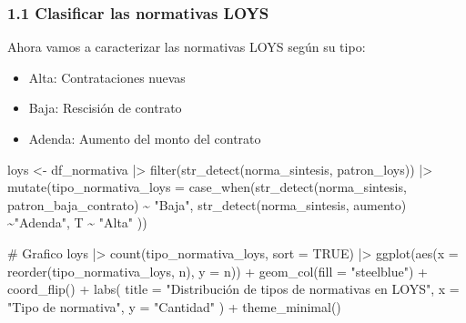 \documentclass[
  letterpaper,
  DIV=11,
  numbers=noendperiod]{scrreprt}
\newenvironment{Shaded}{\begin{snugshade}}{\end{snugshade}}
\newcommand{\AttributeTok}[1]{\textcolor[rgb]{0.40,0.45,0.13}{#1}}
\newcommand{\CommentTok}[1]{\textcolor[rgb]{0.37,0.37,0.37}{#1}}
\newcommand{\ConstantTok}[1]{\textcolor[rgb]{0.56,0.35,0.01}{#1}}
\newcommand{\FunctionTok}[1]{\textcolor[rgb]{0.28,0.35,0.67}{#1}}
\newcommand{\NormalTok}[1]{\textcolor[rgb]{0.00,0.23,0.31}{#1}}
\newcommand{\OtherTok}[1]{\textcolor[rgb]{0.00,0.23,0.31}{#1}}
\newcommand{\SpecialCharTok}[1]{\textcolor[rgb]{0.37,0.37,0.37}{#1}}
\newcommand{\StringTok}[1]{\textcolor[rgb]{0.13,0.47,0.30}{#1}}
\begin{document}
\subsubsection{1.1 Clasificar las normativas
LOYS}\label{clasificar-las-normativas-loys}

Ahora vamos a caracterizar las normativas LOYS según su tipo:

\begin{itemize}
\item
  Alta: Contrataciones nuevas
\item
  Baja: Rescisión de contrato
\item
  Adenda: Aumento del monto del contrato
\end{itemize}

\begin{Shaded}
\begin{Highlighting}[]
\NormalTok{loys }\OtherTok{\textless{}{-}}\NormalTok{ df\_normativa  }\SpecialCharTok{|\textgreater{}} 
  \FunctionTok{filter}\NormalTok{(}\FunctionTok{str\_detect}\NormalTok{(norma\_sintesis, patron\_loys)) }\SpecialCharTok{|\textgreater{}} 
  \FunctionTok{mutate}\NormalTok{(}\AttributeTok{tipo\_normativa\_loys =} \FunctionTok{case\_when}\NormalTok{(}\FunctionTok{str\_detect}\NormalTok{(norma\_sintesis, patron\_baja\_contrato) }\SpecialCharTok{\textasciitilde{}} \StringTok{"Baja"}\NormalTok{,}
                                         \FunctionTok{str\_detect}\NormalTok{(norma\_sintesis, aumento) }\SpecialCharTok{\textasciitilde{}}\StringTok{"Adenda"}\NormalTok{,}
\NormalTok{                                                   T }\SpecialCharTok{\textasciitilde{}} \StringTok{"Alta"}
\NormalTok{                                         ))}

\CommentTok{\# Grafico}
\NormalTok{loys }\SpecialCharTok{|\textgreater{}} 
  \FunctionTok{count}\NormalTok{(tipo\_normativa\_loys, }\AttributeTok{sort =} \ConstantTok{TRUE}\NormalTok{) }\SpecialCharTok{|\textgreater{}} 
  \FunctionTok{ggplot}\NormalTok{(}\FunctionTok{aes}\NormalTok{(}\AttributeTok{x =} \FunctionTok{reorder}\NormalTok{(tipo\_normativa\_loys, n), }\AttributeTok{y =}\NormalTok{ n)) }\SpecialCharTok{+}
  \FunctionTok{geom\_col}\NormalTok{(}\AttributeTok{fill =} \StringTok{"steelblue"}\NormalTok{) }\SpecialCharTok{+}
  \FunctionTok{coord\_flip}\NormalTok{() }\SpecialCharTok{+}
  \FunctionTok{labs}\NormalTok{(}
    \AttributeTok{title =} \StringTok{"Distribución de tipos de normativas en LOYS"}\NormalTok{,}
    \AttributeTok{x =} \StringTok{"Tipo de normativa"}\NormalTok{,}
    \AttributeTok{y =} \StringTok{"Cantidad"}
\NormalTok{  ) }\SpecialCharTok{+}
  \FunctionTok{theme\_minimal}\NormalTok{()}
\end{Highlighting}
\end{Shaded}
\end{document}
